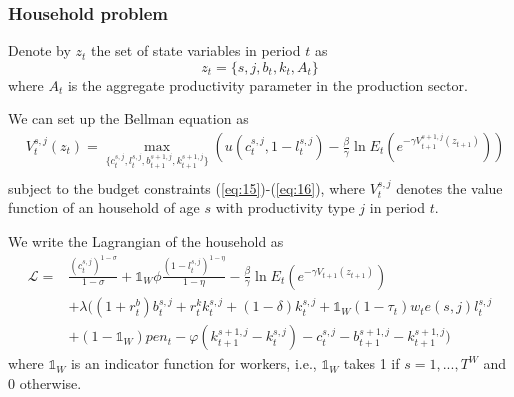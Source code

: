 \documentclass[12pt]{article}
\begin{document}
\subsubsection{Household problem}
Denote by $z_t$ the set of state variables in period $t$ as
\[ z_t=\{s, j, b_t, k_t, A_t\} \]
where $A_t$ is the aggregate productivity parameter in the production sector. 

We can set up the Bellman equation as
\begin{equation}
\begin{split}	
&V_t^{s,j}(z_t) = \max_{\{c_{t}^{s,j},l_{t}^{s,j}, b_{t+1}^{s+1,j}, k_{t+1}^{s+1,j}\}}\left(u(c_{t}^{s,j},{1-l}_{t}^{s,j}) - {\frac{\beta}{\gamma}}\ln E_t\left(e^{{-\gamma}{V_{t+1}^{s+1,j}(z_{t+1})}}\right)\right)\\
\end{split} \label{Bellman}
\end{equation}
subject to the budget constraints (\ref{eq:15})-(\ref{eq:16}), where $V_t^{s,j}$ denotes the value function of an household of age $s$ with productivity type $j$ in period $t$. 

We write the Lagrangian of the household as 
\begin{equation}
\begin{split}	
\mathcal{L} =& \frac{(c_{t}^{s,j})^{1-\sigma}}{1-\sigma}+\mathbb{1}_{W}\phi \frac{(1-l_{t}^{s,j})^{1-\eta}}{1-\eta}-{\frac{\beta}{\gamma}}\ln E_t\left(e^{{-\gamma}{V_{t+1}(z_{t+1})}}\right)\\
&+\lambda\Big((1+r_t^b)b_{t}^{s,j}+r_t^k k_{t}^{s,j}+(1-\delta)k_{t}^{s,j}+\mathbb{1}_{W}(1-\tau_t)w_te(s,j)l_{t}^{s,j}\\
&+(1-\mathbb{1}_{W})pen_t-\varphi(k_{t+1}^{s+1,j}-k_{t}^{s,j})-c_{t}^{s,j}- b_{t+1}^{s+1,j} - k_{t+1}^{s+1,j}\Big) \label{eq:14}
\end{split}
\end{equation}
where $\mathbb{1}_{W}$ is an indicator function for workers, i.e., $\mathbb{1}_{W}$ takes 1 if $s=1,...,T^W$ and 0 otherwise.
\end{document}
